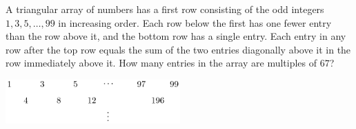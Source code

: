 A triangular array of numbers has a first row consisting of the odd integers $ 1,3,5,\ldots,99$ in increasing order.  Each row below the first has one fewer entry than the row above it, and the bottom row has a single entry.  Each entry in any row after the top row equals the sum of the two entries diagonally above it in the row immediately above it.  How many entries in the array are multiples of $ 67$?
\begin{center}
\includegraphics[width = 67.0mm]{img/fig0.png}
\end{center}